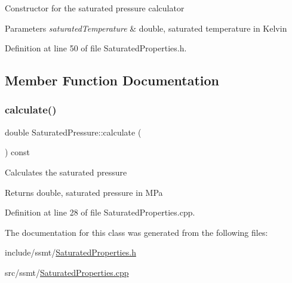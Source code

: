 Constructor for the saturated pressure calculator 
\begin{DoxyParams}{Parameters}
{\em saturated\+Temperature} & double, saturated temperature in Kelvin \\
\hline
\end{DoxyParams}


Definition at line 50 of file Saturated\+Properties.\+h.



\subsection{Member Function Documentation}
\mbox{\label{class_saturated_pressure_a8ef5357b4f8af1aeaa8dde6ae05b9daa}} 
\subsubsection{\texorpdfstring{calculate()}{calculate()}}
{\footnotesize\ttfamily double Saturated\+Pressure\+::calculate (\begin{DoxyParamCaption}{ }\end{DoxyParamCaption}) const}

Calculates the saturated pressure \begin{DoxyReturn}{Returns}
double, saturated pressure in M\+Pa 
\end{DoxyReturn}


Definition at line 28 of file Saturated\+Properties.\+cpp.



The documentation for this class was generated from the following files\+:\begin{DoxyCompactItemize}
\item 
include/ssmt/\hyperlink{_saturated_properties_8h}{Saturated\+Properties.\+h}\item 
src/ssmt/\hyperlink{_saturated_properties_8cpp}{Saturated\+Properties.\+cpp}\end{DoxyCompactItemize}
